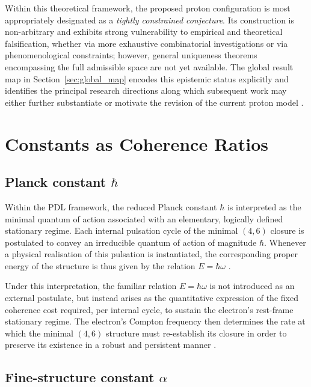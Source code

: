 \documentclass{article}
\begin{document}
Within this theoretical framework, the proposed proton configuration is most appropriately designated as a \emph{tightly constrained conjecture}. Its construction is non-arbitrary and exhibits strong vulnerability to empirical and theoretical falsification, whether via more exhaustive combinatorial investigations or via phenomenological constraints; however, general uniqueness theorems encompassing the full admissible space are not yet available. The global result map in Section~\ref{sec:global_map} encodes this epistemic status explicitly and identifies the principal research directions along which subsequent work may either further substantiate or motivate the revision of the current proton model \citep{PDL_position}.

\section{Constants as Coherence Ratios}
\label{sec:constants}

\subsection{Planck constant \texorpdfstring{\(\hbar\)}{hbar}}
\label{subsec:hbar}

Within the PDL framework, the reduced Planck constant \(\hbar\) is interpreted as the minimal quantum of action associated with an elementary, logically defined stationary regime. Each internal pulsation cycle of the minimal \((4,6)\) closure is postulated to convey an irreducible quantum of action of magnitude \(\hbar\). Whenever a physical realisation of this pulsation is instantiated, the corresponding proper energy of the structure is thus given by the relation \(E = \hbar \omega\)
\citep{PDL_Main_2026,PDL_intro}.

Under this interpretation, the familiar relation \(E = \hbar \omega\) is not introduced as an external postulate, but instead arises as the quantitative expression of the fixed coherence cost required, per internal cycle, to sustain the electron’s rest-frame stationary regime. The electron’s Compton frequency then determines the rate at which the minimal \((4,6)\) structure must re-establish its closure in order to preserve its existence in a robust and persistent manner
\citep{PDL_Main_2026,PDL_position}.

\subsection{Fine-structure constant \texorpdfstring{\(\alpha\)}{alpha}}
\label{subsec:alpha}
\end{document}
